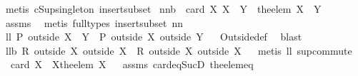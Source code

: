 \begin{isabellebody}
\ {\isacharparenleft}metis\ cSup{\isacharunderscore}singleton\ insert{\isacharunderscore}subset{\isacharparenright}%
\endisatagproof
{\isafoldproof}%
%
\isadelimproof
%
\endisadelimproof
\isanewline
{}\isamarkupfalse%
\ nn{}{}b{\isacharcolon}\ \ {\isachardoublequoteopen}card\ X{\isacharequal}{}{\isachardoublequoteclose}\ {\isachardoublequoteopen}X\ {\isasymsubseteq}\ Y{\isachardoublequoteclose}\ \ {\isachardoublequoteopen}the{\isacharunderscore}elem\ X\ {\isasymin}\ Y{\isachardoublequoteclose}%
\isadelimproof
\ %
\endisadelimproof
%
\isatagproof
{}\isamarkupfalse%
\ assms\ \isanewline
{}\isamarkupfalse%
\ {\isacharparenleft}metis\ {\isacharparenleft}full{\isacharunderscore}types{\isacharparenright}\ insert{\isacharunderscore}subset\ nn{}{}{\isacharparenright}%
\endisatagproof
{\isafoldproof}%
%
\isadelimproof
%
\endisadelimproof
\isanewline
\isanewline
{}\isamarkupfalse%
\ ll{}{}{\isacharcolon}\ {\isachardoublequoteopen}P\ outside\ {\isacharparenleft}X\ {\isasymunion}\ Y{\isacharparenright}\ {\isacharequal}\ {\isacharparenleft}P\ outside\ X{\isacharparenright}\ outside\ Y{\isachardoublequoteclose}%
\isadelimproof
\ %
\endisadelimproof
%
\isatagproof
{}\isamarkupfalse%
\ Outside{\isacharunderscore}def\ \isamarkupfalse%
\ blast%
\endisatagproof
{\isafoldproof}%
%
\isadelimproof
%
\endisadelimproof
\isanewline
\isanewline
{}\isamarkupfalse%
\ ll{}{}b{\isacharcolon}\ {\isachardoublequoteopen}{\isacharparenleft}R\ outside\ X{}{\isacharparenright}\ outside\ X{}\ {\isacharequal}\ {\isacharparenleft}R\ outside\ X{}{\isacharparenright}\ outside\ X{}{\isachardoublequoteclose}%
\isadelimproof
\ %
\endisadelimproof
%
\isatagproof
{}\isamarkupfalse%
\ {\isacharparenleft}metis\ ll{}{}\ sup{\isacharunderscore}commute{\isacharparenright}%
\endisatagproof
{\isafoldproof}%
%
\isadelimproof
%
\endisadelimproof
\isanewline
{}\isamarkupfalse%
\ \ {\isachardoublequoteopen}card\ X{\isacharequal}{}{\isachardoublequoteclose}\ \ {\isachardoublequoteopen}X{\isacharequal}{\isacharbraceleft}the{\isacharunderscore}elem\ X{\isacharbraceright}{\isachardoublequoteclose}%
\isadelimproof
\ %
\endisadelimproof
%
\isatagproof
{}\isamarkupfalse%
\ assms\ card{\isacharunderscore}eq{\isacharunderscore}SucD\ the{\isacharunderscore}elem{\isacharunderscore}eq\ \isamarkupfalse%

\end{isabellebody}
